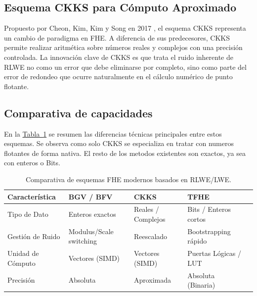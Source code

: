 \subsection{Esquema CKKS para Cómputo Aproximado}

Propuesto por Cheon, Kim, Kim y Song en 2017 \cite{CKKS17}, el esquema CKKS representa un cambio de paradigma en FHE. A diferencia de sus predecesores, CKKS permite realizar aritmética sobre números reales y complejos con una precisión controlada. La innovación clave de CKKS es que trata el ruido inherente de RLWE no como un error que debe eliminarse por completo, sino como parte del error de redondeo que ocurre naturalmente en el cálculo numérico de punto flotante. 

\subsection{Comparativa de capacidades}

En la \hyperref[tab:fhe_comparativa]{Tabla~\ref{tab:fhe_comparativa}} se resumen las diferencias técnicas principales entre estos esquemas. Se observa como solo CKKS se especializa en tratar con numeros flotantes de forma nativa. El resto de los metodos existentes son exactos, ya sea con enteros o Bits.

\begin{table}[h]
    \centering
    \caption{Comparativa de esquemas FHE modernos basados en RLWE/LWE.}\label{tab:fhe_comparativa}
    \vspace{0.5em}
    \begin{tabular}{| l | l | l | l | l |}
        \hline
        Característica & BGV / BFV & CKKS & TFHE \\ 
        \hline
        
        Tipo de Dato & Enteros exactos & Reales / Complejos & Bits / Enteros cortos \\ 
        \hline
        
        Gestión de Ruido & Modulus/Scale switching & Reescalado & Bootstrapping rápido \\ 
        \hline
        
        Unidad de Cómputo & Vectores (SIMD) & Vectores (SIMD) & Puertas Lógicas / LUT \\ 
        \hline
        
        Precisión & Absoluta & Aproximada & Absoluta (Binaria) \\ 
        \hline
    \end{tabular}
\end{table}

